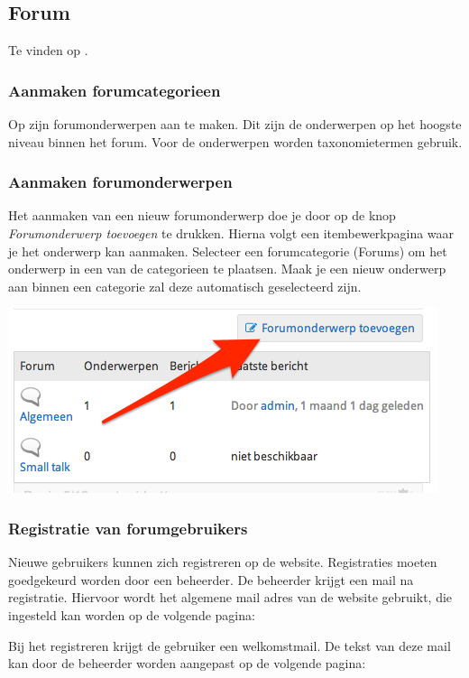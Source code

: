 \subsection{Forum}\label{forum}
Te vinden op .

\subsubsection{Aanmaken forumcategorieen}\label{forumcategorieen}
Op  zijn forumonderwerpen aan te maken. Dit zijn de onderwerpen op het hoogste niveau binnen het forum. Voor de onderwerpen worden taxonomietermen gebruik.

\subsubsection{Aanmaken forumonderwerpen}\label{forumonderwerpen}
Het aanmaken van een nieuw forumonderwerp doe je door op de knop \emph{Forumonderwerp toevoegen} te drukken. Hierna volgt een itembewerkpagina waar je het onderwerp kan aanmaken. Selecteer een forumcategorie (Forums) om het onderwerp in een van de categorieen te plaatsen. Maak je een nieuw onderwerp aan binnen een categorie zal deze automatisch geselecteerd zijn.

\begin{center}
	\includegraphics[width=\textwidth]{img/forumonderwerp.png}
\end{center}

\subsubsection{Registratie van forumgebruikers}

Nieuwe gebruikers kunnen zich registreren op de website. Registraties moeten goedgekeurd worden door een beheerder. De beheerder krijgt een mail na registratie. Hiervoor wordt het algemene mail adres van de website gebruikt, die ingesteld kan worden op de volgende pagina:


Bij het registreren krijgt de gebruiker een welkomstmail. De tekst van deze mail kan door de beheerder worden aangepast op de volgende pagina:



